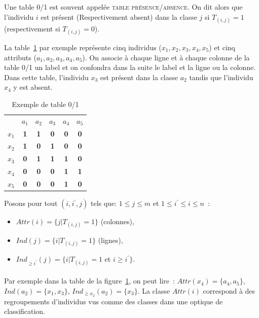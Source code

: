\documentclass[a4paper]{report}
\renewcommand{\textbf}[1]{\begingroup\bfseries\mathversion{bold}#1\endgroup}
\begin{document}
Une table 0/1 est souvent appelée \textsc{table présence/absence}. On dit alors que l'individu $i$ est présent 
(Respectivement absent) dans la classe $j$ si $T_{(i, j)} = 1$ (respectivement si $T_{(i, j)} = 0$).

La table~\ref{ex_tab_0_1} par exemple représente cinq individus ($x_1, x_2, x_3, x_4, x_5$) et cinq attributs ($a_1, a_2, a_3, a_4, a_5$).
On associe à chaque ligne et à chaque colonne de la table 0/1 un label et on confondra dans la suite le label et la ligne ou la colonne.
Dans cette table, l'individu $x_3$ est présent dans la classe $a_2$ tandis que l'individu $x_4$ y est absent.


\begin{table}[htb]
  \centering

\begin{tabular}{lccccc}
 & $a_1$ & $a_2$ & $a_3$ & $a_4$ & $a_5$\\
$x_1$ & \textbf{1} & \textbf{1} & \textbf{0} & \textbf{0} & \textbf{0}\\
$x_2$ & \textbf{1} & \textbf{0} & \textbf{1} & \textbf{0} & \textbf{0}\\
$x_3$ & \textbf{0} & \textbf{1} & \textbf{1} & \textbf{1} & \textbf{0}\\
$x_4$ & \textbf{0} & \textbf{0} & \textbf{0} & \textbf{1} & \textbf{1}\\
$x_5$ & \textbf{0} & \textbf{0} & \textbf{0} & \textbf{1} & \textbf{0}

\end{tabular}
\caption{Exemple de table 0/1  }
\label{ex_tab_0_1}
\end{table}

Posons pour tout $(i, i^{'}, j)$ tels que: $1 \leq j \leq m$ et $1 \leq i^{'} \leq i \leq n$~:
\begin{itemize}
    \item $Attr(i) = \{j | T_{(i, j)} = 1 \}$ (colonnes),
    \item $Ind(j) = \{i | T_{(i, j)} = 1 \}$ (lignes),
    \item $Ind_{\geqslant i^{'}}(j) = \{i | T_{(i, j)} = 1$ et $i \geqslant i^{'} \}$.
\end{itemize}


\paragraph{}Par exemple dans la table de la figure~\ref{ex_tab_0_1}, on peut lire~: $Attr(x_4) = \{a_4, a_5 \}$, 
$Ind(a_2) = \{x_1, x_3 \}$,
$Ind_{\geqslant x_2}(a_2) = \{x_3 \}$. La classe
$Attr(i)$ correspond à des regroupements d'individus vus comme des classes dans une optique de classification.
\end{document}
